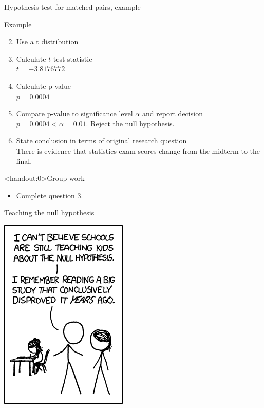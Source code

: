 \documentclass[xcolor=table, aspectratio=169, bigger, handout]{beamer}
\begin{document}
\begin{frame}{Hypothesis test for matched pairs, example}
\begin{exampleblock}{Example}
\begin{enumerate}
\setcounter{enumi}{1}

\item Use a t distribution
\pause\item Calculate $t$ test statistic\\
\pause$t=-3.8176772$
\pause\item Calculate p-value\\
\pause$p = 0.0004$
\pause\item Compare p-value to significance level $\alpha$ and report decision\\
\pause$p = 0.0004 < \alpha = 0.01$. Reject the null hypothesis.
\pause\item State conclusion in terms of original research question\\
\pause There is evidence that statistics exam scores change from the midterm to the final.
\end{enumerate}

\end{exampleblock}
\end{frame}


\begin{frame}<handout:0>{Group work}
\begin{block}{}
\large
\begin{itemize}
\item Complete question 3.
\end{itemize}
\end{block}
\end{frame} 


\begin{frame}{Teaching the null hypothesis}
\smallskip
{\centering
\includegraphics[width=1.8 in]{../images/wk09_null_hypothesis}
\par}
\end{frame}
\end{document}
